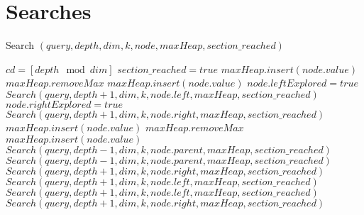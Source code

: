 \documentclass{article}
\begin{document}
\section{Searches}
\begin{algorithm}
    \caption{Search $(query, depth, dim, k, node, maxHeap, section\_reached)$}\label{alg:cap}
    \begin{algorithmic}
        \State $cd = [depth \mod dim]$
            \State $section\_reached = true$
        \EndIf
            \State $maxHeap.insert(node.value)$
            \State $maxHeap.removeMax$
            \State $maxHeap.insert(node.value)$
        \EndIf
                \State $node.leftExplored = true$
                \State $Search(query, depth+1, dim, k, node.left, maxHeap, section\_reached)$
                \State $node.rightExplored = true$
                \State $Search(query, depth+1, dim, k, node.right, maxHeap, section\_reached)$
            \EndIf
        \Else
                \State $maxHeap.insert(node.value)$
                \State $maxHeap.removeMax$
                \State $maxHeap.insert(node.value)$
            \EndIf
                \State $Search(query, depth-1, dim, k, node.parent, maxHeap, section\_reached)$
            \Else
                    \State $Search(query, depth-1, dim, k, node.parent, maxHeap, section\_reached)$
                    \State $Search(query, depth+1, dim, k, node.right, maxHeap, section\_reached)$
                    \State $Search(query, depth+1, dim, k, node.left, maxHeap, section\_reached)$
                    \State $Search(query, depth+1, dim, k, node.left, maxHeap, section\_reached)$
                    \State $Search(query, depth+1, dim, k, node.right, maxHeap, section\_reached)$
                \EndIf
            \EndIf
        \EndIf
        
    \end{algorithmic}
\end{algorithm}
\end{document}
